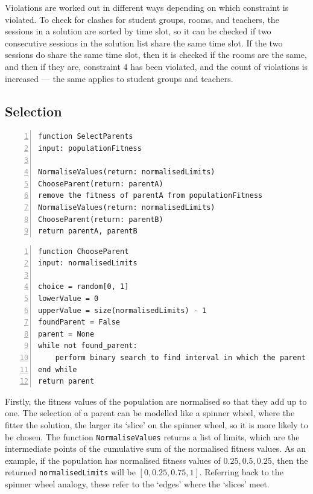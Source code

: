 \documentclass[a4paper, 12pt]{report}
\begin{document}
Violations are worked out in different ways depending on which constraint is
violated.
To check for clashes for student groups, rooms, and teachers, the sessions in a 
solution are sorted by time slot, so it can be checked if two consecutive 
sessions in the solution list share the same time slot.
If the two sessions do share the same time slot, then it is checked if the rooms
are the same, and then if they are, constraint 4 has been violated, and the 
count of violations is increased --- the same applies to student groups and 
teachers.


\subsection{Selection}

\begin{Verbatim}[numbers=left, fontsize=\footnotesize]
function SelectParents
input: populationFitness

NormaliseValues(return: normalisedLimits)
ChooseParent(return: parentA)
remove the fitness of parentA from populationFitness
NormaliseValues(return: normalisedLimits)
ChooseParent(return: parentB)
return parentA, parentB
\end{Verbatim}

\begin{Verbatim}[numbers=left, fontsize=\footnotesize]
function ChooseParent
input: normalisedLimits

choice = random[0, 1]
lowerValue = 0
upperValue = size(normalisedLimits) - 1
foundParent = False
parent = None
while not found_parent:
    perform binary search to find interval in which the parent lies
end while
return parent
\end{Verbatim}

Firstly, the fitness values of the population are normalised so that they add 
up to one. The selection of a parent can be modelled like a spinner wheel, where
the fitter the solution, the larger its `slice' on the spinner wheel, so it is 
more likely to be chosen.
The function \verb|NormaliseValues| returns a list of limits, which are the 
intermediate points of the cumulative sum of the normalised fitness values.
As an example, if the population has normalised fitness values of 
\( 0.25,0.5,0.25 \), then the returned \verb|normalisedLimits| will be 
\( [0,0.25,0.75,1] \).
Referring back to the spinner wheel analogy, these refer to the `edges' where 
the `slices' meet.
\end{document}
